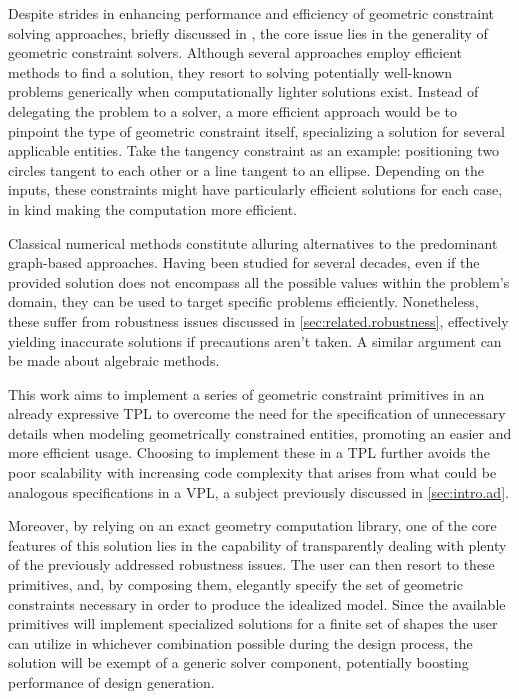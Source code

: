 %
\label{chap:solution}
\cleardoublepage{}

\noindent
Despite strides in enhancing performance and efficiency of geometric constraint
solving approaches, briefly discussed in , the core
issue lies in the generality of geometric constraint solvers.  Although several
approaches employ efficient methods to find a solution, they resort to solving
potentially well-known problems generically when computationally lighter
solutions exist.  Instead of delegating the problem to a solver, a more
efficient approach would be to pinpoint the type of geometric constraint itself,
specializing a solution for several applicable entities.  Take the tangency
constraint as an example: positioning two circles tangent to each other or a
line tangent to an ellipse.  Depending on the inputs, these constraints might
have particularly efficient solutions for each case, in kind making the
computation more efficient.

Classical numerical methods constitute alluring alternatives to the predominant
graph-based approaches.  Having been studied for several decades, even if the
provided solution does not encompass all the possible values within the
problem's domain, they can be used to target specific problems efficiently.
Nonetheless, these suffer from robustness issues discussed in
\cref{sec:related.robustness}, effectively yielding inaccurate solutions if
precautions aren't taken.  A similar argument can be made about algebraic
methods.

This work aims to implement a series of geometric constraint primitives in an
already expressive \ac{TPL} to overcome the need for the specification of
unnecessary details when modeling geometrically constrained entities, promoting
an easier and more efficient usage.  Choosing to implement these in a \ac{TPL}
further avoids the poor scalability with increasing code complexity that arises
from what could be analogous specifications in a \ac{VPL}, a subject previously
discussed in \cref{sec:intro.ad}.

Moreover, by relying on an exact geometry computation library, one of the core
features of this solution lies in the capability of transparently dealing with
plenty of the previously addressed robustness issues.  The user can then resort
to these primitives, and, by composing them, elegantly specify the set of
geometric constraints necessary in order to produce the idealized model.  Since
the available primitives will implement specialized solutions for a finite set
of shapes the user can utilize in whichever combination possible during the
design process, the solution will be exempt of a generic solver component,
potentially boosting performance of design generation.

